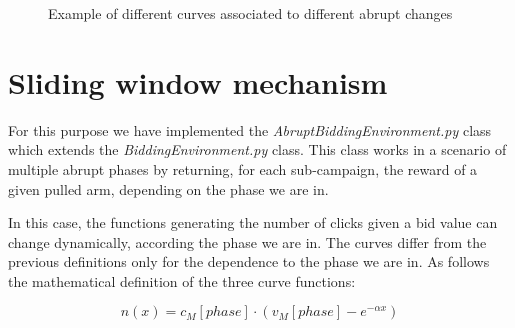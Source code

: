 \begin{figure}[!htb]
	\caption{Example of different curves associated to different abrupt changes}
	\label{abruptFigure}
\end{figure}


\section{Sliding window mechanism}
For this purpose we have implemented the \textit{AbruptBiddingEnvironment.py} class which extends the \textit{BiddingEnvironment.py} class. This class works in a scenario of multiple abrupt phases by returning, for each sub-campaign, the reward of a given pulled arm, depending on the phase we are in.

In this case, the functions generating  the number of clicks given a bid value can change dynamically, according the phase we are in.
The curves differ from the previous definitions only for the dependence to the phase we are in. As follows the mathematical definition of the three curve functions:

\begin{equation}
	n(x) = c_{M}[phase] \cdot (v_{M}[phase] - e^{-\alpha x})
\end{equation}

